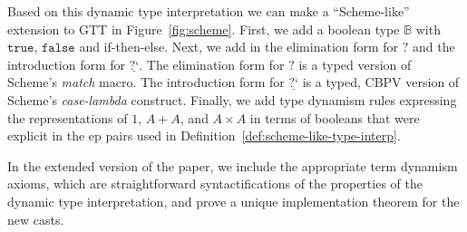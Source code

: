 \documentclass[acmsmall,nonacm]{acmart}
\renewcommand{\u}{\underline}
\newcommand{\tru}{\texttt{true}}
\newcommand{\fls}{\texttt{false}}
\newcommand{\bool}{\mathbb{B}}
\newcommand{\dynv}{{?}}
\newcommand{\dync}{\u {\text{?`}}}
\begin{document}
Based on this dynamic type interpretation we can make a ``Scheme-like''
extension to GTT in Figure~\ref{fig:scheme}.
%
First, we add a boolean type $\bool$ with $\tru$, $\fls$ and
if-then-else.
%
Next, we add in the elimination form for $\dynv$ and the introduction
form for $\dync$.
%
The elimination form for $\dynv$ is a typed version of Scheme's
\emph{match} macro.
%
The introduction form for $\dync$ is a typed, CBPV version of Scheme's
\emph{case-lambda} construct.
%
Finally, we add type dynamism rules expressing the representations of
$1$, $A + A$, and $A \times A$ in terms of booleans that were explicit
in the ep pairs used in Definition~\ref{def:scheme-like-type-interp}.
\begin{shortonly}
  In the extended version of the paper, we include the appropriate term
  dynamism axioms, which are straightforward syntactifications of the
  properties of the dynamic type interpretation, and prove a unique
  implementation theorem for the new casts.
\end{shortonly}
\end{document}
